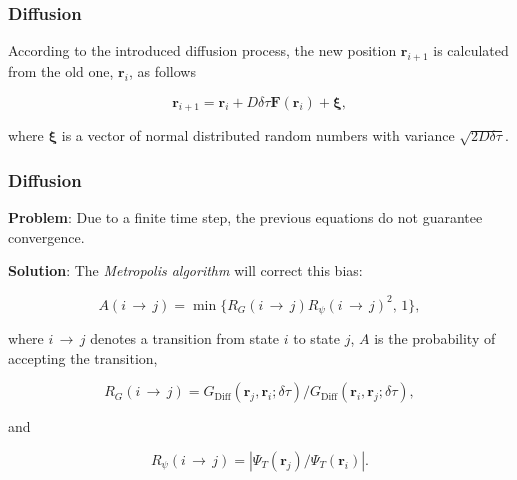 \begin{frame}
 \frametitle{Diffusion}
 
%  
%  

According to the introduced diffusion process, the new position $\mathbf{r}_{i+1}$ is calculated from the old one, $\mathbf{r}_i$, as follows
 
 \begin{equation*}
  \mathbf{r}_{i+1} = \mathbf{r}_i + D\delta\tau\mathbf{F}(\mathbf{r}_i) + \mathbf{\xi}, 
 \end{equation*}

where $\mathbf{\xi}$ is a vector of normal distributed random numbers with variance $\sqrt{2D\delta\tau}$.
 
\end{frame}

\begin{frame}
\frametitle{Diffusion}

\textbf{Problem}: Due to a finite time step, the previous equations do not guarantee convergence.  
\shift

\textbf{Solution}: The \textit{Metropolis algorithm} will correct this bias:  

\begin{equation*}
  A(i\,\rightarrow\,j) = \min\{R_G(i\,\rightarrow\,j)R_\psi(i\,\rightarrow\,j)^2, \,1\},
\end{equation*}

where $i\,\rightarrow\,j$ denotes a transition from state $i$ to state $j$, $A$ is the probability of accepting the transition, 

\begin{equation*}
 R_G(i\,\rightarrow\,j) = G_\mathrm{Diff}(\mathbf{r}_{j}, \mathbf{r}_{i}; \delta\tau)/G_\mathrm{Diff}(\mathbf{r}_{i}, \mathbf{r}_{j}; \delta\tau),
\end{equation*}

and

\begin{equation*}
 R_\psi(i\,\rightarrow\,j) = |\Psi_T(\mathbf{r}_j)/\Psi_T(\mathbf{r}_i)|.
\end{equation*}

\end{frame}



